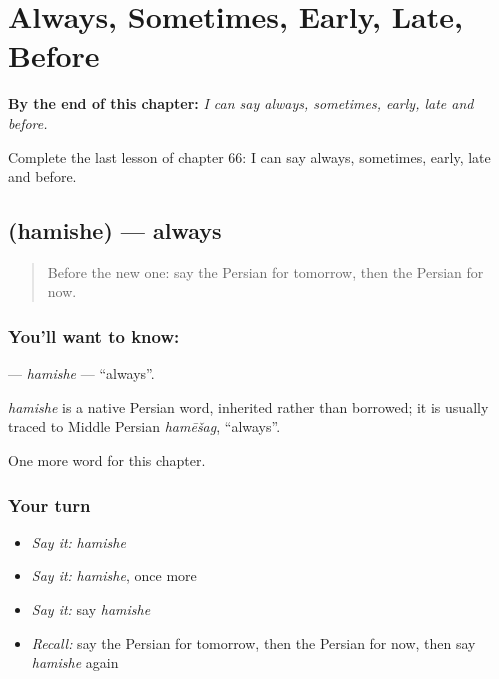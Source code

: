 
\chapter{Always, Sometimes, Early, Late, Before}
\label{ch:fa-always-sometimes-early-late-before}

\begin{chapteropening}
\textbf{By the end of this chapter:} \emph{I can say always, sometimes, early, late and before.}

Complete the last lesson of chapter 66: I can say always, sometimes, early, late and before.
\end{chapteropening}

\section[\texorpdfstring{\fa{همیشه} (hamishe)}{همیشه (hamishe)}]{ (hamishe) — always}

\label{lesson:FA-C66-hamishe}



\begin{quote}
Before the new one: say the Persian for tomorrow, then the Persian for now.
\end{quote}

\subsection*{You'll want to know: }
\textbf{} — \emph{hamishe} — \textquotedblleft{}always\textquotedblright{}.

\begin{cousinweb}
\emph{hamishe} is a native Persian word, inherited rather than borrowed; it is usually traced to Middle Persian \emph{hamēšag}, \textquotedblleft{}always\textquotedblright{}.
\end{cousinweb}

\begin{grammarlens}[title={What you've built}]
One more word for this chapter.
\end{grammarlens}

\subsection*{Your turn}
\begin{itemize}
\raggedright
  \item \emph{Say it:} \emph{hamishe}
  \item \emph{Say it:} \emph{hamishe}, once more
  \item \emph{Say it:} say \emph{hamishe}
  \item \emph{Recall:} say the Persian for tomorrow, then the Persian for now, then say \emph{hamishe} again
\end{itemize}

